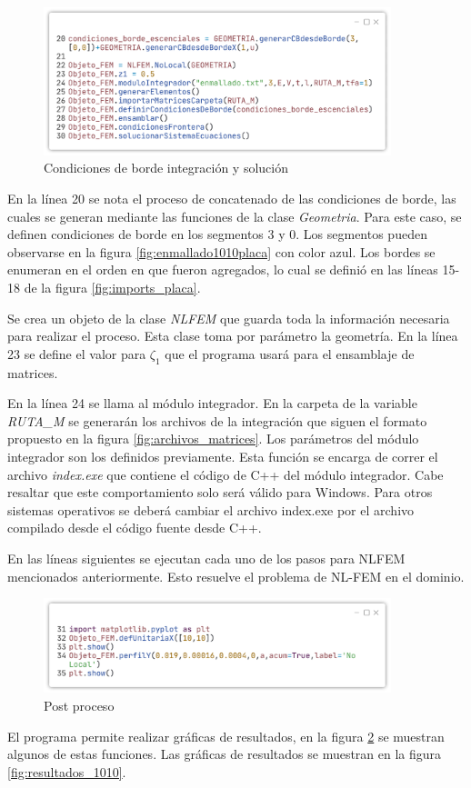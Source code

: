 \begin{enumerate}
		\begin{figure}
			\centering
			\sffamily
			\includegraphics[width=0.9\textwidth]{figuras/placa_c2.pdf}
			\caption{Condiciones de borde integración y solución}
			\label{fig:integracion_ysolucion}
		\end{figure}
		En la línea 20 se nota el proceso de concatenado de las condiciones de borde, las cuales se generan mediante las funciones de la clase \textit{Geometria}. Para este caso, se definen condiciones de borde en los segmentos 3 y 0. Los segmentos pueden observarse en la figura \ref{fig:enmallado1010placa} con color azul. Los bordes se enumeran en el orden en que fueron agregados, lo cual se definió en las líneas 15-18 de la figura \ref{fig:imports_placa}.
		
		Se crea un objeto de la clase \textit{NLFEM} que guarda toda la información necesaria para realizar el proceso. Esta clase toma por parámetro la geometría. En la línea 23 se define el valor para $\zeta_1$ que el programa usará para el ensamblaje de matrices.

		En la línea 24 se llama al módulo integrador. En la carpeta de la variable \textit{RUTA\_M} se generarán los archivos de la integración que siguen el formato propuesto en la figura \ref{fig:archivos_matrices}. Los parámetros del módulo integrador son los definidos previamente. Esta función se encarga de correr el archivo \textit{index.exe} que contiene el código de C++ del módulo integrador. Cabe resaltar que este comportamiento solo será válido para Windows. Para otros sistemas operativos se deberá cambiar el archivo index.exe por el archivo compilado desde el código fuente desde C++.

		En las líneas siguientes se ejecutan cada uno de los pasos para NLFEM mencionados anteriormente. Esto resuelve el problema de NL-FEM en el dominio.

		\begin{figure}
			\centering
			\sffamily
			\includegraphics[width=0.9\textwidth]{figuras/placa_c3.pdf}
			\caption{Post proceso}
			\label{fig:postproceso}
		\end{figure}
		El programa permite realizar gráficas de resultados, en la figura \ref{fig:postproceso} se muestran algunos de estas funciones. Las gráficas de resultados se muestran en la figura \ref{fig:resultados_1010}.


\end{enumerate}
